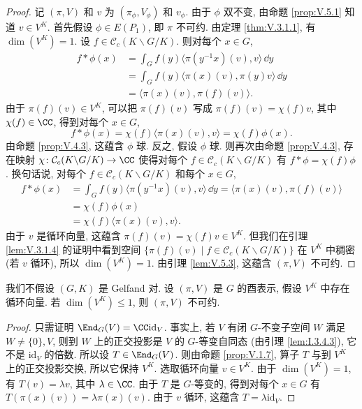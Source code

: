 \begin{proof}
记 $(\pi, V)$ 和 $v$ 为 $(\pi_{\phi}, V_{\phi})$ 和 $v_{\phi}$. 由于 $\phi$ 双不变, 由命题 \ref{prop:V.5.1} 知道 $v \in V^K$. 首先假设 $\phi \in E(P_1)$, 即 $\pi$ 不可约. 由定理 \ref{thm:V.3.1.1}, 有 $\dim(V^K) = 1$. 设 $f \in \mathcal{C}_c(K\backslash G/K)$. 则对每个 $x \in G$,
\begin{align*}
f * \phi(x) &= \int_G f(y)\langle \pi(y^{-1}x)(v), v \rangle\,\dd y \\
&= \int_G f(y)\langle \pi(x)(v), \pi(y)v \rangle\,\dd y \\
&= \langle \pi(x)(v), \pi(f)(v) \rangle.
\end{align*}
由于 $\pi(f)(v) \in V^K$, 可以把 $\pi(f)(v)$ 写成 $\pi(f)(v) = \chi(f)v$, 其中 $\chi(f) \in \CC$, 得到对每个 $x \in G$,
\[
f * \phi(x) = \chi(f)\langle \pi(x)(v), v \rangle = \chi(f)\phi(x).
\]
由命题 \ref{prop:V.4.3}, 这蕴含 $\phi$ 球.
反之, 假设 $\phi$ 球. 则再次由命题 \ref{prop:V.4.3}, 存在映射 $\chi \colon \mathcal{C}_c(K\backslash G/K) \to \CC$ 使得对每个 $f \in \mathcal{C}_c(K\backslash G/K)$ 有 $f * \phi = \chi(f)\phi$. 换句话说, 对每个 $f \in \mathcal{C}_c(K\backslash G/K)$ 和每个 $x \in G$,
\begin{align*}
f * \phi(x) &= \int_G f(y)\langle \pi(y^{-1}x)(v), v \rangle\,\dd y = \langle \pi(x)(v), \pi(f)(v) \rangle \\
&= \chi(f)\phi(x) \\
&= \chi(f)\langle \pi(x)(v), v \rangle.
\end{align*}
由于 $v$ 是循环向量, 这蕴含 $\pi(f)(v) = \chi(f)v \in V^K$. 但我们在引理 \ref{lem:V.3.1.4} 的证明中看到空间 $\{\pi(f)(v) \mid f \in \mathcal{C}_c(K\backslash G/K)\}$ 在 $V^K$ 中稠密 (若 $v$ 循环), 所以 $\dim(V^K) = 1$. 由引理 \ref{lem:V.5.3}, 这蕴含 $(\pi, V)$ 不可约.
\end{proof}

\begin{lemma}[$K$-固定循环向量与不可约性]
\label{lem:V.5.3}
我们不假设 $(G, K)$ 是 Gelfand 对. 设 $(\pi, V)$ 是 $G$ 的酉表示, 假设 $V^K$ 中存在循环向量. 若 $\dim(V^K) \leq 1$, 则 $(\pi, V)$ 不可约.
\end{lemma}

\begin{proof}
只需证明 $\End_G(V) = \CC\mathrm{id}_V$. 事实上, 若 $V$ 有闭 $G$-不变子空间 $W$ 满足 $W \neq \{0\}, V$, 则到 $W$ 上的正交投影是 $V$ 的 $G$-等变自同态 (由引理 \ref{lem:I.3.4.3}), 它不是 $\mathrm{id}_V$ 的倍数.
所以设 $T \in \End_G(V)$. 则由命题 \ref{prop:V.1.7}, 算子 $T$ 与到 $V^K$ 上的正交投影交换, 所以它保持 $V^K$. 选取循环向量 $v \in V^K$. 由于 $\dim(V^K) = 1$, 有 $T(v) = \lambda v$, 其中 $\lambda \in \CC$. 由于 $T$ 是 $G$-等变的, 得到对每个 $x \in G$ 有 $T(\pi(x)(v)) = \lambda\pi(x)(v)$. 由于 $v$ 循环, 这蕴含 $T = \lambda\mathrm{id}_V$.
\end{proof}

